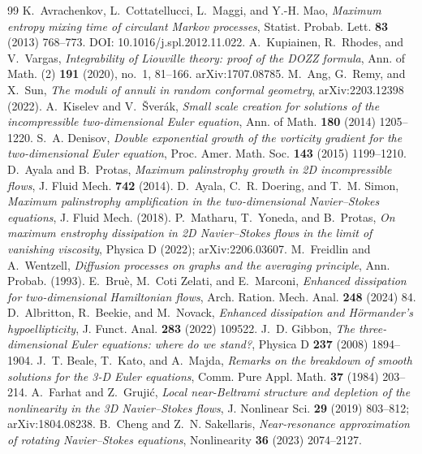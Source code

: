\documentclass[11pt]{article}
\theoremstyle{definition}
\begin{document}
\begin{thebibliography}{99}
 K.~Avrachenkov, L.~Cottatellucci, L.~Maggi, and Y.-H. Mao, \emph{Maximum entropy mixing time of circulant Markov processes}, Statist. Probab. Lett. \textbf{83} (2013) 768--773. DOI: 10.1016/j.spl.2012.11.022.
 A.~Kupiainen, R.~Rhodes, and V.~Vargas, \emph{Integrability of Liouville theory: proof of the DOZZ formula}, Ann. of Math. (2) \textbf{191} (2020), no.~1, 81--166. arXiv:1707.08785.
 M.~Ang, G.~Remy, and X.~Sun, \emph{The moduli of annuli in random conformal geometry}, arXiv:2203.12398 (2022).
 A.~Kiselev and V.~\v Sver\'ak, \emph{Small scale creation for solutions of the incompressible two-dimensional Euler equation}, Ann. of Math. \textbf{180} (2014) 1205--1220.
 S.~A. Denisov, \emph{Double exponential growth of the vorticity gradient for the two-dimensional Euler equation}, Proc. Amer. Math. Soc. \textbf{143} (2015) 1199--1210.
 D.~Ayala and B.~Protas, \emph{Maximum palinstrophy growth in 2D incompressible flows}, J. Fluid Mech. \textbf{742} (2014).
 D.~Ayala, C.~R. Doering, and T.~M. Simon, \emph{Maximum palinstrophy amplification in the two-dimensional Navier--Stokes equations}, J. Fluid Mech. (2018).
 P.~Matharu, T.~Yoneda, and B.~Protas, \emph{On maximum enstrophy dissipation in 2D Navier--Stokes flows in the limit of vanishing viscosity}, Physica D (2022); arXiv:2206.03607.
 M.~Freidlin and A.~Wentzell, \emph{Diffusion processes on graphs and the averaging principle}, Ann. Probab. (1993).
 E.~Bru\`e, M.~Coti Zelati, and E.~Marconi, \emph{Enhanced dissipation for two-dimensional Hamiltonian flows}, Arch. Ration. Mech. Anal. \textbf{248} (2024) 84.
 D.~Albritton, R.~Beekie, and M.~Novack, \emph{Enhanced dissipation and H\"ormander's hypoellipticity}, J. Funct. Anal. \textbf{283} (2022) 109522.
 J.~D. Gibbon, \emph{The three-dimensional Euler equations: where do we stand?}, Physica D \textbf{237} (2008) 1894--1904.
 J.~T. Beale, T.~Kato, and A.~Majda, \emph{Remarks on the breakdown of smooth solutions for the 3-D Euler equations}, Comm. Pure Appl. Math. \textbf{37} (1984) 203--214.
 A.~Farhat and Z.~Gruji\'c, \emph{Local near-Beltrami structure and depletion of the nonlinearity in the 3D Navier--Stokes flows}, J. Nonlinear Sci. \textbf{29} (2019) 803--812; arXiv:1804.08238.
 B.~Cheng and Z.~N. Sakellaris, \emph{Near-resonance approximation of rotating Navier--Stokes equations}, Nonlinearity \textbf{36} (2023) 2074--2127.

\end{thebibliography}
\end{document}
